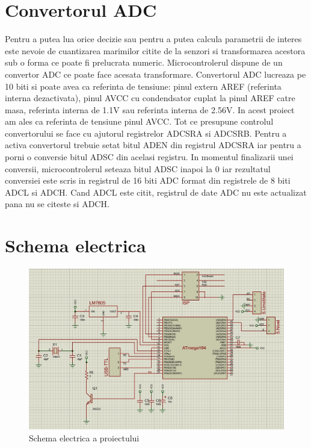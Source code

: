 \documentclass[12pt]{article}
\begin{document}
\section{Convertorul ADC}
\hspace{8 mm} Pentru a putea lua orice decizie sau pentru a putea calcula parametrii de interes este nevoie de cuantizarea marimilor citite de la senzori si transformarea acestora sub o forma ce poate fi prelucrata numeric. Microcontrolerul dispune de un convertor ADC ce poate face acesata transformare. Convertorul ADC lucreaza pe 10 biti si poate avea ca referinta de tensiune: pinul extern AREF (referinta interna dezactivata), pinul AVCC cu condendsator cuplat la pinul AREF catre masa, referinta interna de 1.1V sau referinta interna de 2.56V. In acest proiect am ales ca referinta de tensiune pinul AVCC. Tot ce presupune controlul convertorului se face cu ajutorul registrelor ADCSRA si ADCSRB. Pentru a activa convertorul trebuie setat bitul ADEN din registrul ADCSRA iar pentru a porni o conversie bitul ADSC din acelasi registru. In momentul finalizarii unei conversii, microcontrolerul seteaza bitul ADSC inapoi la 0 iar rezultatul conversiei este scris in registrul de 16 biti ADC format din registrele de 8 biti ADCL si ADCH. Cand ADCL este citit, registrul de date ADC nu este actualizat pana nu se citeste si ADCH.


\newpage

\section{ Schema electrica}
\begin{figure}[H]
\centering
\includegraphics[width=\textwidth]{Pictures/schemael.jpeg}
\caption{Schema electrica a proiectului}
\end{figure}
\newpage
\end{document}
